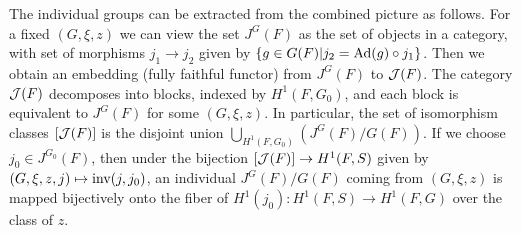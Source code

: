 \documentclass{article}
\theoremstyle{definition}
\numberwithin{equation}{section}
\renewcommand{\-}{\hyp{}}
\begin{document}
The individual groups can be extracted from the combined picture as follows. For a fixed $(G,\xi,z)$ we can view the set $J^G(F)$ as the set of objects in a category, with set of morphisms $j_1 \to j_2$ given by $\{g \in G(F)|j_2=\textrm{Ad}(g)\circ j_1\}$. Then we obtain an embedding (fully faithful functor) from $J^G(F)$ to $\mathcal{J}(F)$. The category $\mathcal{J}(F)$ decomposes into blocks, indexed by $H^1(F,G_0)$, and each block is equivalent to $J^G(F)$ for some $(G,\xi,z)$. In particular, the set of isomorphism classes $[\mathcal{J}(F)]$ is the disjoint union $\bigcup_{H^1(F,G_0)} (J^G(F)/G(F))$. If we choose $j_0 \in J^{G_0}(F)$, then under the bijection $[\mathcal{J}(F)] \to H^1(F,S)$ given by $(G,\xi,z,j) \mapsto \textrm{inv}(j,j_0)$, an individual $J^G(F)/G(F)$ coming from $(G,\xi,z)$ is mapped bijectively onto the fiber of $H^1(j_0) : H^1(F,S) \to H^1(F,G)$ over the class of $z$.
\end{document}
